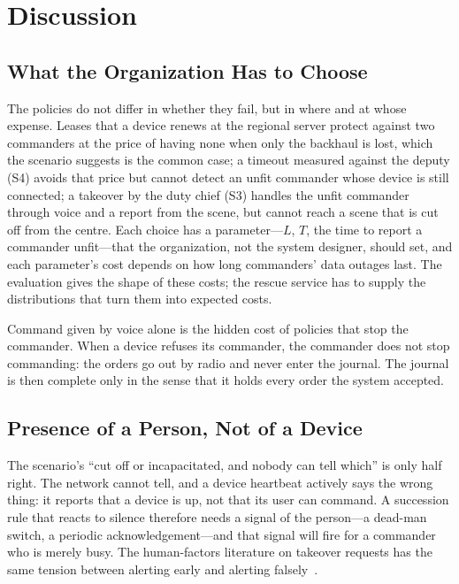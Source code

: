 \section{Discussion}
\label{sec:discussion}

\subsection{What the Organization Has to Choose}
\label{sec:org-choices}

The policies do not differ in whether they fail, but in where and at whose expense.
Leases that a device renews at the regional server protect against two commanders at the
price of having none when only the backhaul is lost, which the scenario suggests is the
common case; a timeout measured against the deputy (S4) avoids that price but cannot
detect an unfit commander whose device is still connected; a takeover by the duty chief
(S3) handles the unfit commander through voice and a report from the scene, but cannot reach
a scene that is cut off from the centre. Each choice has a parameter---$L$, $T$, the time to
report a commander unfit---that the organization, not the system designer, should set, and
each parameter's cost depends on how long commanders' data outages last. The evaluation
gives the shape of these costs; the rescue service has to supply the distributions that
turn them into expected costs. 

Command given by voice alone is the hidden cost of policies that stop the commander. When a
device refuses its commander, the commander does not stop commanding: the orders go out by
radio and never enter the journal. The journal is then complete only in the sense that it
holds every order the system accepted.

\subsection{Presence of a Person, Not of a Device}
\label{sec:presence}

The scenario's ``cut off or incapacitated, and nobody can tell which'' is only half right.
The network cannot tell, and a device heartbeat actively says the wrong thing: it reports
that a device is up, not that its user can command. A succession rule that reacts to
silence therefore needs a signal of the person---a dead-man switch, a periodic
acknowledgement---and that signal will fire for a commander who is merely busy. The
human-factors literature on takeover requests has the same tension between alerting early
and alerting falsely~\cite{grindley2024handover}. 

